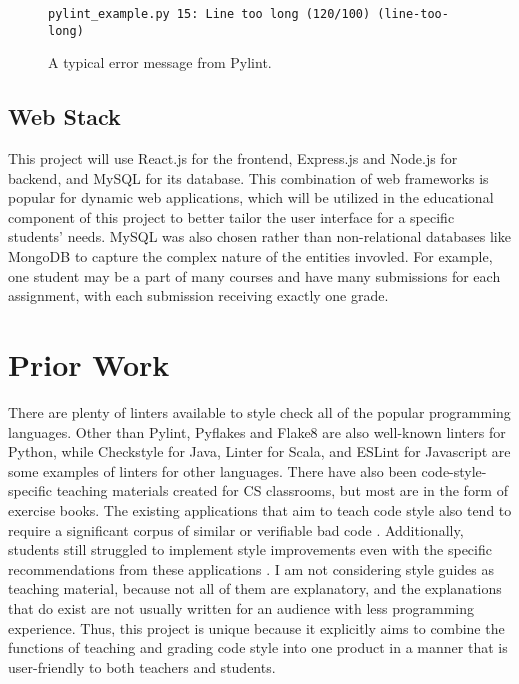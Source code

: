 \documentclass[10pt,twocolumn]{article}
\begin{document}
\begin{figure}
\vspace{7 mm}
\begin{lstlisting}
pylint_example.py 15: Line too long (120/100) (line-too-long)
\end{lstlisting}
\vspace{7 mm}
	\centering
	\caption{A typical error message from Pylint.}
\end{figure}


\subsection{Web Stack}
This project will use React.js for the frontend, Express.js and Node.js for backend, and MySQL for its database. 
This combination of web frameworks is popular for dynamic web applications, which will be utilized in the educational component of this project to better tailor the user interface for a specific students' needs. 
MySQL was also chosen rather than non-relational databases like MongoDB to capture the complex nature of the entities invovled. 
For example, one student may be a part of many courses and have many submissions for each assignment, with each submission receiving exactly one grade.


\section{Prior Work}
There are plenty of linters available to style check all of the popular programming languages. Other than Pylint, Pyflakes and Flake8 are also well-known linters for Python, while Checkstyle for Java, Linter for Scala, and ESLint for Javascript are some examples of linters for other languages. There have also been code-style-specific teaching materials created for CS classrooms, but most are in the form of exercise books. The existing applications that aim to teach code style also tend to require a significant corpus of similar \cite{moghadam_2015} or verifiable bad code  \cite{mcmaster_2013}. Additionally, students still struggled to implement style improvements even with the specific recommendations from these applications \cite{wiese_2017}. I am not considering style guides as teaching material, because not all of them are explanatory, and the explanations that do exist are not usually written for an audience with less programming experience. Thus, this project is unique because it explicitly aims to combine the functions of teaching and grading code style into one product in a manner that is user-friendly to both teachers and students.
\end{document}
